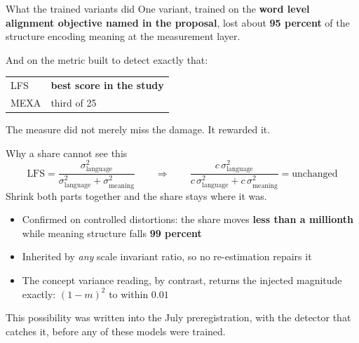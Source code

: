 \documentclass[aspectratio=169,11pt]{beamer}
\newcommand{\Hi}[1]{{\color{acc}\textbf{#1}}}
\newcommand{\Bad}[1]{{\color{warn}\textbf{#1}}}
\begin{document}
\begin{frame}{What the trained variants did}
\Large
One variant, trained on the \Hi{word level alignment objective named
in the proposal}, lost about \Bad{95 percent} of the structure encoding
meaning at the measurement layer.
\vspace{16pt}

\normalsize
And on the metric built to detect exactly that:
\vspace{6pt}
\begin{center}\large
\begin{tabular}{ll}
\toprule
LFS & \Bad{best score in the study}\\
MEXA & third of 25\\
\bottomrule
\end{tabular}
\end{center}
\vspace{10pt}
{\color{mut}The measure did not merely miss the damage. It rewarded
it.}
\end{frame}

\begin{frame}{Why a share cannot see this}
\[
\text{LFS} = \frac{\sigma^2_{\text{language}}}
{\sigma^2_{\text{language}} + \sigma^2_{\text{meaning}}}
\qquad\Longrightarrow\qquad
\frac{c\,\sigma^2_{\text{language}}}
{c\,\sigma^2_{\text{language}} + c\,\sigma^2_{\text{meaning}}}
= \text{unchanged}
\]
\vspace{4pt}
Shrink both parts together and the share stays where it was.
\vspace{12pt}
\begin{itemize}\setlength\itemsep{6pt}
\item Confirmed on controlled distortions: the share moves \Hi{less
than a millionth} while meaning structure falls \Bad{99 percent}
\item Inherited by \emph{any} scale invariant ratio, so no
re-estimation repairs it
\item The concept variance reading, by contrast, returns the injected
magnitude exactly: $(1-m)^2$ to within $0.01$
\end{itemize}
\vspace{8pt}
{\color{mut}This possibility was written into the July preregistration,
with the detector that catches it, before any of these models were
trained.}
\end{frame}
\end{document}
